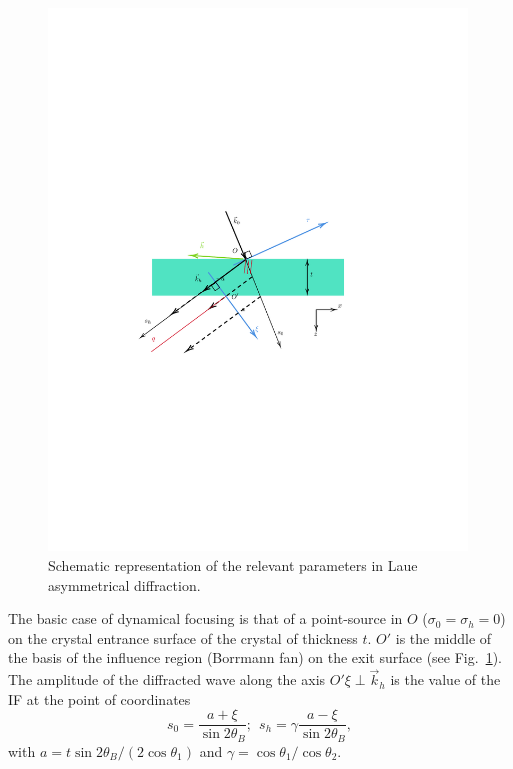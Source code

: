 \documentclass[preprint]{iucr}              %
\begin{document}
\begin{figure}
\label{fig:laue}
\caption{Schematic representation of the relevant parameters in Laue asymmetrical diffraction.
}
\includegraphics[width=0.99\textwidth,trim=3cm 10cm 5cm 10cm,clip=true]{fig3.pdf}
\end{figure}

The basic case of dynamical focusing is that of a point-source in $O$ ($\sigma_0=\sigma_h=0$) on the crystal entrance surface of the crystal of thickness $t$.
$O'$ is the middle of the basis of the influence region (Borrmann fan) on the exit surface (see Fig.~\ref{fig:laue}).
The amplitude of the diffracted wave along the axis $O'\xi \perp \vec k_h$ is the value of the IF at the point of coordinates 
\begin{equation}
    \label{eq:s0andsh}
    s_0 = \frac{a+\xi}{\sin2\theta_B }  ; \:\: 
    s_h = \gamma\frac{a-\xi}{\sin2\theta_B},
\end{equation}
with $a=t \sin2\theta_B/(2\cos\theta_1)$ and $\gamma=\cos\theta_1/\cos\theta_2$. 
\end{document}

